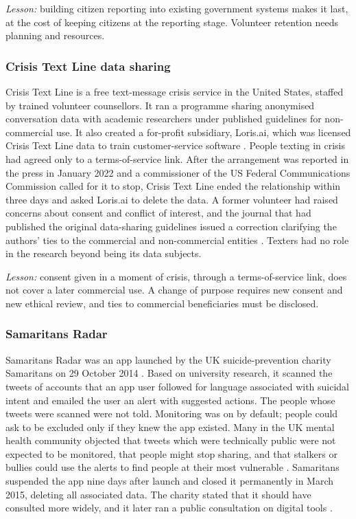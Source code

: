 \documentclass[
  number,
  preprint]{elsarticle}
\begin{document}
\emph{Lesson:} building citizen reporting into existing government
systems makes it last, at the cost of keeping citizens at the reporting
stage. Volunteer retention needs planning and resources.

\subsubsection{Crisis Text Line data
sharing}\label{crisis-text-line-data-sharing}

Crisis Text Line is a free text-message crisis service in the United
States, staffed by trained volunteer counsellors. It ran a programme
sharing anonymised conversation data with academic researchers under
published guidelines for non-commercial use. It also created a
for-profit subsidiary, Loris.ai, which was licensed Crisis Text Line
data to train customer-service software \citep{eysenbach2025}. People
texting in crisis had agreed only to a terms-of-service link. After the
arrangement was reported in the press in January 2022 and a commissioner
of the US Federal Communications Commission called for it to stop,
Crisis Text Line ended the relationship within three days and asked
Loris.ai to delete the data. A former volunteer had raised concerns
about consent and conflict of interest, and the journal that had
published the original data-sharing guidelines issued a correction
clarifying the authors' ties to the commercial and non-commercial
entities \citep{eysenbach2025}. Texters had no role in the research
beyond being its data subjects.

\emph{Lesson:} consent given in a moment of crisis, through a
terms-of-service link, does not cover a later commercial use. A change
of purpose requires new consent and new ethical review, and ties to
commercial beneficiaries must be disclosed.

\subsubsection{Samaritans Radar}\label{samaritans-radar}

Samaritans Radar was an app launched by the UK suicide-prevention
charity Samaritans on 29 October 2014 \citep{responsibledata_radar}.
Based on university research, it scanned the tweets of accounts that an
app user followed for language associated with suicidal intent and
emailed the user an alert with suggested actions. The people whose
tweets were scanned were not told. Monitoring was on by default; people
could ask to be excluded only if they knew the app existed. Many in the
UK mental health community objected that tweets which were technically
public were not expected to be monitored, that people might stop
sharing, and that stalkers or bullies could use the alerts to find
people at their most vulnerable \citep{responsibledata_radar}.
Samaritans suspended the app nine days after launch
\citep{irishtimes2014} and closed it permanently in March 2015, deleting
all associated data. The charity stated that it should have consulted
more widely, and it later ran a public consultation on digital tools
\citep{responsibledata_radar}.
\end{document}
